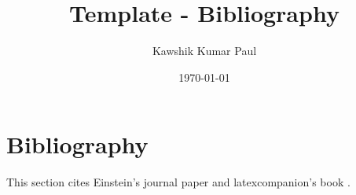 \documentclass[16pt, a4paper]{article} %
\title{Template - Bibliography}
\author{Kawshik Kumar Paul}
\date{\today}
\begin{document}
\maketitle
\tableofcontents %
\pagebreak %

\section{Bibliography}
This section cites Einstein's journal paper \cite{einstein} and latexcompanion's book \cite{latexcompanion}. 

\printbibliography
\end{document}
